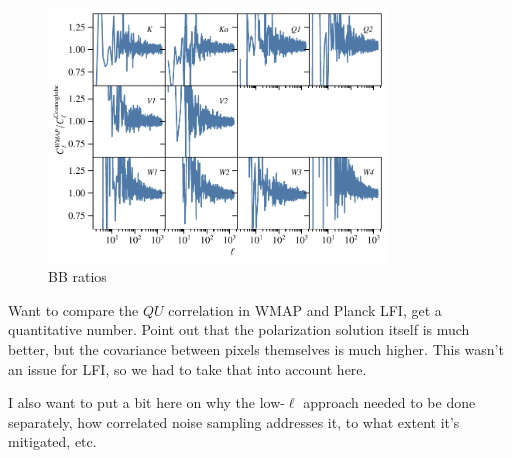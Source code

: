 \documentclass[twocolumn]{../../common/aa}
\begin{document}
\begin{figure}
	\centering
	\includegraphics[width=0.8\textwidth]{figures/BB_spectra_ratio.pdf}
	\caption{BB ratios}
\end{figure}




\clearpage


Want to compare the $QU$ correlation in WMAP and Planck LFI, get a quantitative number. Point out that the polarization solution itself is much better, but the covariance between pixels themselves is much higher. This wasn't an issue for LFI, so we had to take that into account here.

I also want to put a bit here on why the low-$\ell$ approach needed to be done separately, how correlated noise sampling addresses it, to what extent it's mitigated, etc.
\end{document}
